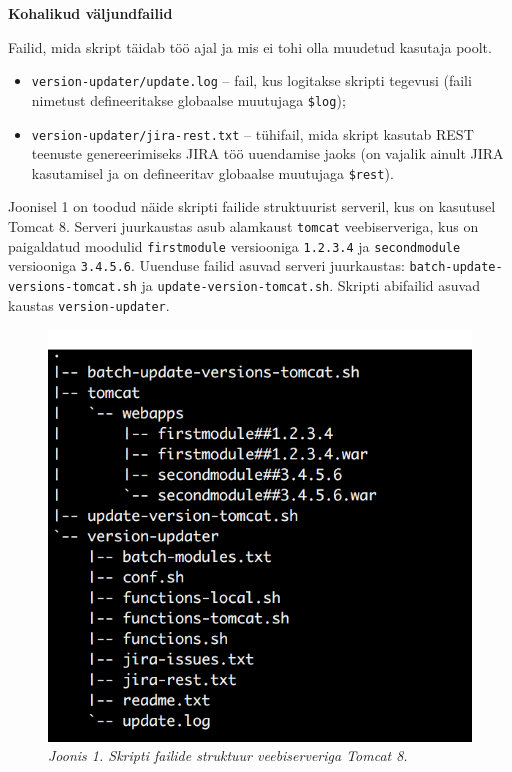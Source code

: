 \documentclass[12pt]{report}
\newcommand{\code}[1]{\texttt{#1}}
\begin{document}
  \textbf{Kohalikud väljundfailid}
  
  Failid, mida skript täidab töö ajal ja mis ei tohi olla muudetud kasutaja poolt.
  
  \begin{itemize}
    \item \code{version-updater/update.log} \--- fail, kus logitakse skripti tegevusi (faili nimetust defineeritakse globaalse muutujaga \code{\$log});
    \item \code{version-updater/jira-rest.txt} \--- tühifail, mida skript kasutab REST teenuste genereerimiseks JIRA töö uuendamise jaoks (on vajalik ainult JIRA kasutamisel ja on defineeritav globaalse muutujaga \code{\$rest}).
  \end{itemize}
  
  Joonisel 1 on toodud näide skripti failide struktuurist serveril, kus on kasutusel Tomcat 8. Serveri juurkaustas asub alamkaust \code{tomcat} veebiserveriga, kus on paigaldatud moodulid \code{firstmodule} versiooniga \code{1.2.3.4} ja \code{secondmodule} versiooniga \code{3.4.5.6}. Uuenduse failid asuvad serveri juurkaustas: \code{batch-update-versions-tomcat.sh} ja \code{update-version-tomcat.sh}. Skripti abifailid asuvad kaustas \code{version-updater}.
  
  \begin{figure}[H] 
    \begin{center}
      \includegraphics{screenshots/file-structure-on-tomcat.png}
      \caption*{\textit{Joonis 1. Skripti failide struktuur veebiserveriga Tomcat 8.}}
      \end{center}
   \end{figure}
   
\end{document}
